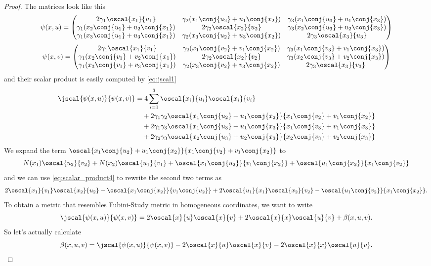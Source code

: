 \begin{proof}
The matrices look like this
\[
\psi(x,u) =
\begin{pmatrix}
2\gamma_1\oscal{x_1}{u_1} & \gamma_2(x_1\conj{u_2} + u_1\conj{x_2}) & \gamma_3(x_1\conj{u_3} + u_1\conj{x_3})  \\
\gamma_1(x_2\conj{u_1} + u_2\conj{x_1}) & 2\gamma_2\oscal{x_2}{u_2} & \gamma_3(x_2\conj{u_3} + u_2\conj{x_3})  \\
\gamma_1(x_3\conj{u_1} + u_3\conj{x_1}) & \gamma_2(x_3\conj{u_2} + u_3\conj{x_2}) & 2\gamma_3\oscal{x_3}{u_3}
\end{pmatrix}
\]
\[
\psi(x,v) =
\begin{pmatrix}
2\gamma_1\oscal{x_1}{v_1} & \gamma_2(x_1\conj{v_2} + v_1\conj{x_2}) & \gamma_3(x_1\conj{v_3} + v_1\conj{x_3})  \\
\gamma_1(x_2\conj{v_1} + v_2\conj{x_1}) & 2\gamma_2\oscal{x_2}{v_2} & \gamma_3(x_2\conj{v_3} + v_2\conj{x_3})  \\
\gamma_1(x_3\conj{v_1} + v_3\conj{x_1}) & \gamma_2(x_3\conj{v_2} + v_3\conj{x_2}) & 2\gamma_3\oscal{x_3}{v_3}
\end{pmatrix}
\]
and their scalar product is easily computed by \eqref{eq:jscal1}
\begin{align*}
    \jscal{\psi(x,u)}{\psi(x,v)} & = 4\sum_{i=1}^3 \oscal{x_i}{u_i}\oscal{x_i}{v_i} \\
            &\quad + 2\gamma_1\gamma_2 \oscal{ x_1\conj{u_2} + u_1\conj{x_2} }{ x_1\conj{v_2} + v_1\conj{x_2} } \\
            &\quad + 2\gamma_1\gamma_3 \oscal{ x_1\conj{u_3} + u_1\conj{x_3} }{ x_1\conj{v_3} + v_1\conj{x_3} } \\
            &\quad + 2\gamma_2\gamma_3 \oscal{ x_2\conj{u_3} + u_2\conj{x_3} }{ x_2\conj{v_3} + v_2\conj{x_3} } 
\end{align*}
We expand the term $\oscal{ x_1\conj{u_2} + u_1\conj{x_2} }{ x_1\conj{v_2} + v_1\conj{x_2} }$ to
\[
	N(x_1)\oscal{u_2}{v_2} + N(x_2)\oscal{u_1}{v_1} + \oscal{x_1\conj{u_2}}{v_1\conj{x_2}} + \oscal{u_1\conj{x_2}}{x_1\conj{v_2}}
\]
and we can use \eqref{eq:scalar_product4} to rewrite the second two terms as
\[
2\oscal{x_1}{v_1}\oscal{x_2}{u_2} - \oscal{x_1\conj{x_2}}{v_1\conj{u_2}} + 2\oscal{u_1}{x_1}\oscal{x_2}{v_2} - \oscal{u_1\conj{v_2}}{x_1\conj{x_2}}.
\]
To obtain a metric that resembles Fubini-Study metric in homogeneous coordinates, we want to write 
\[\jscal{\psi(x,u)}{\psi(x,v)}  = 2\oscal{x}{u}\oscal{x}{v} + 2\oscal{x}{x}\oscal{u}{v} + \beta(x,u,v).\]
So let's actually calculate 
\[
\beta(x,u,v) = \jscal{\psi(x,u)}{\psi(x,v)}  - 2\oscal{x}{u}\oscal{x}{v} - 2\oscal{x}{x}\oscal{u}{v}.
\]


\end{proof}
